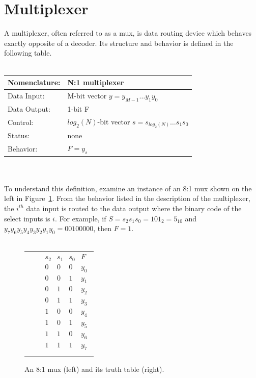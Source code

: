 \section{Multiplexer}
A multiplexer, often referred to as a mux, is data routing device 
which behaves exactly opposite of a decoder.  Its structure and
behavior is defined in the following table.
\\ \\
\begin{tabular}{|l|p{3.5in}|} \hline
Nomenclature:  & N:1 multiplexer                        \\ \hline
Data Input:    & M-bit vector $y=y_{M-1} \ldots y_1 y_0$    \\ \hline
Data Output:   & 1-bit F          \\ \hline
Control:       & $log_2(N)$-bit vector $s = s_{log_2(N)} \ldots s_1 s_0$	\\ \hline
Status:        & none                                   \\ \hline
Behavior:      & $F = y_s$				\\ \hline
\end{tabular}
\label{page:mux}
\\ \\
To understand this definition, examine an
instance of an 8:1 mux shown on the left in Figure~\ref{fig:8:1}.
From the behavior listed in the description of the multiplexer, 
the $i^{th}$ data input is routed to the data
output where the binary code of the select inputs is $i$.
For example, if $S=s_2 s_1 s_0 = 101_2 = 5_{10}$  and 
$y_7 y_6 y_5 y_4 y_3 y_2 y_1 y_0 = 00100000$, then
$F=1$.
\\ \\
\begin{figure}[ht]
\begin{tabular}{p{1.5in}p{0.5in}l}
\includegraphics[0mm,20mm][12mm,12mm]{./Fig4/8:1.eps} & &
$\begin{array}{c|c|c||c}
s_2 & s_1 & s_0 & F \\ \hline
0 & 0 & 0 & y_0 \\ \hline
0 & 0 & 1 & y_1 \\ \hline
0 & 1 & 0 & y_2 \\ \hline
0 & 1 & 1 & y_3 \\ \hline
1 & 0 & 0 & y_4 \\ \hline
1 & 0 & 1 & y_5 \\ \hline
1 & 1 & 0 & y_6 \\ \hline
1 & 1 & 1 & y_7 \\
\end{array}$
\end{tabular}
\caption{An 8:1 mux (left) and its truth table (right).}
\label{fig:8:1}
\end{figure}

